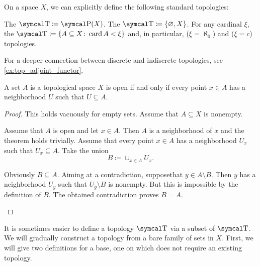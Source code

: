 \begin{definition}\label{def:standard_topologies}
  On a space \( X \), we can explicitly define the following standard topologies:
  \begin{defenum}
     The  \( \CT \coloneqq \Power(X) \).
     The  \( \CT \coloneqq \{ \varnothing, X \} \).
     For any cardinal \( \xi \), the  \( \CT \coloneqq \{ A \subseteq X \colon \Card A < \xi \} \) and, in particular,  (\( \xi = \aleph_0 \)) and  (\( \xi = c \)) topologies.
  \end{defenum}

  For a deeper connection between discrete and indiscrete topologies, see \cref{ex:top_adjoint_functor}.
\end{definition}

\begin{proposition}\label{thm:set_open_iff_neighborhood_is_contained}
  A set \( A \) is a topological space \( X \) is open if and only if every point \( x \in A \) has a neighborhood \( U \) such that \( U \subseteq A \).
\end{proposition}
\begin{proof}
  This holds vacuously for empty sets. Assume that \( A \subseteq X \) is nonempty.

  \begin{description}
    \Implies Assume that \( A \) is open and let \( x \in A \). Then \( A \) is a neighborhood of \( x \) and the theorem holds trivially.
    \ImpliedBy Assume that every point \( x \in A \) has a neighborhood \( U_x \) such that \( U_x \subseteq A \). Take the union
    \begin{equation*}
      B \coloneqq \cup_{x \in A} U_x.
    \end{equation*}

    Obviously \( B \subseteq A \). Aiming at a contradiction, suppose\LEM that \( y \in A \setminus B \). Then \( y \) has a neighborhood \( U_y \) such that \( U_y \setminus B \) is nonempty. But this is impossible by the definition of \( B \). The obtained contradiction proves \( B = A \).
  \end{description}
\end{proof}

\begin{remark}\label{remark:abritrary_family_to_topology}
  It is sometimes easier to define a topology \( \CT \) via a subset of \( \CT \). We will gradually construct a topology from a bare family of sets in \( X \). First, we will give two definitions for a base, one on which does not require an existing topology.
\end{remark}

